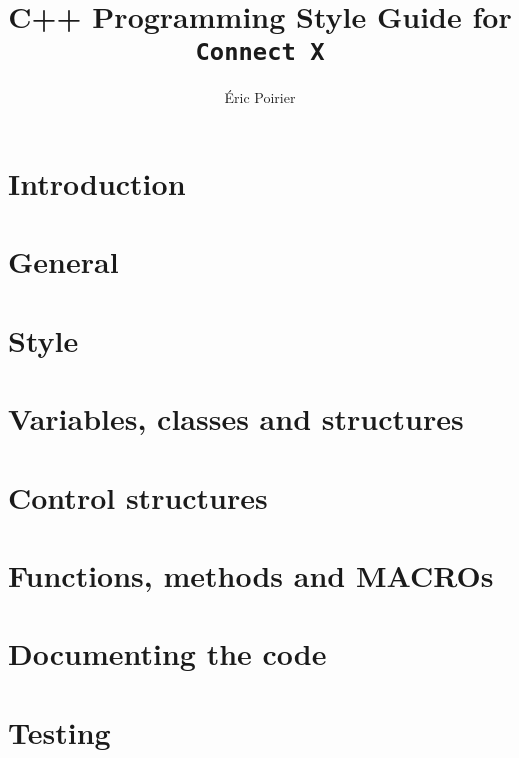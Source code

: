 \documentclass{report}
\newcommand{\files}{./files/}
\begin{document}
\title{C++ Programming Style Guide for \texttt{Connect X}}
\author{Éric Poirier}
\maketitle




\chapter{Introduction}                         
\chapter{General}                              
\chapter{Style}                                
\chapter{Variables, classes and structures}    
\chapter{Control structures}                   
\chapter{Functions, methods and MACROs}        
\chapter{Documenting the code}                 
\chapter{Testing}                              



\end{document}
